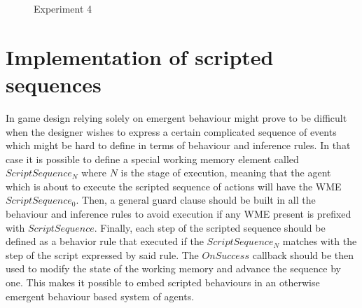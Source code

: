 \begin{figure}[h]
    \centering
    \hspace*{\fill}
    \hspace*{\fill}

    \caption{Experiment 4} \label{fig:experiment3}
\end{figure}

\section{Implementation of scripted sequences}

In game design relying solely on emergent behaviour might prove to be difficult when the designer wishes to express a certain complicated sequence of events which might be hard to define in terms of behaviour and inference rules.
In that case it is possible to define a special working memory element called $ScriptSequence_N$ where $N$ is the stage of execution, meaning that the agent which is about to execute the scripted sequence of actions will have the WME $ScriptSequence_0$.
Then, a general guard clause should be built in all the behaviour and inference rules to avoid execution if any WME present is prefixed with $ScriptSequence$.
Finally, each step of the scripted sequence should be defined as a behavior rule that executed if the $ScriptSequence_N$ matches with the step of the script expressed by said rule.
The $OnSuccess$ callback should be then used to modify the state of the working memory and advance the sequence by one.
This makes it possible to embed scripted behaviours in an otherwise emergent behaviour based system of agents.

